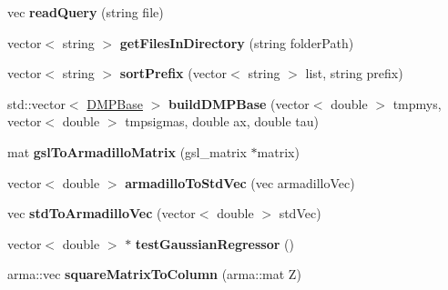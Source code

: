 \begin{DoxyCompactItemize}
\item 
\hypertarget{namespacekukadu_ac3b7339c98a02ebbacff3272fd3aa6e0}{vec {\bfseries read\-Query} (string file)}\label{namespacekukadu_ac3b7339c98a02ebbacff3272fd3aa6e0}

\item 
\hypertarget{namespacekukadu_a8967b22ed1eec57bc76b687a63ab4a03}{vector$<$ string $>$ {\bfseries get\-Files\-In\-Directory} (string folder\-Path)}\label{namespacekukadu_a8967b22ed1eec57bc76b687a63ab4a03}

\item 
\hypertarget{namespacekukadu_a6c32f5b1575bda3fba2fb6aa361e6f71}{vector$<$ string $>$ {\bfseries sort\-Prefix} (vector$<$ string $>$ list, string prefix)}\label{namespacekukadu_a6c32f5b1575bda3fba2fb6aa361e6f71}

\item 
\hypertarget{namespacekukadu_a383a9d72755140f9dcf797a99e9eb77d}{std\-::vector$<$ \hyperlink{classkukadu_1_1DMPBase}{D\-M\-P\-Base} $>$ {\bfseries build\-D\-M\-P\-Base} (vector$<$ double $>$ tmpmys, vector$<$ double $>$ tmpsigmas, double ax, double tau)}\label{namespacekukadu_a383a9d72755140f9dcf797a99e9eb77d}

\item 
\hypertarget{namespacekukadu_affb25d35d5eef5bc7d803a94c0e66739}{mat {\bfseries gsl\-To\-Armadillo\-Matrix} (gsl\-\_\-matrix $\ast$matrix)}\label{namespacekukadu_affb25d35d5eef5bc7d803a94c0e66739}

\item 
\hypertarget{namespacekukadu_aa526722c4b4af0fe1798ec3dc80c8ce5}{vector$<$ double $>$ {\bfseries armadillo\-To\-Std\-Vec} (vec armadillo\-Vec)}\label{namespacekukadu_aa526722c4b4af0fe1798ec3dc80c8ce5}

\item 
\hypertarget{namespacekukadu_aa810194d5e61a8bfbf3d3b1e4aa405ef}{vec {\bfseries std\-To\-Armadillo\-Vec} (vector$<$ double $>$ std\-Vec)}\label{namespacekukadu_aa810194d5e61a8bfbf3d3b1e4aa405ef}

\item 
\hypertarget{namespacekukadu_affc5bcde345f3ad613e5546d02a167c4}{vector$<$ double $>$ $\ast$ {\bfseries test\-Gaussian\-Regressor} ()}\label{namespacekukadu_affc5bcde345f3ad613e5546d02a167c4}

\item 
\hypertarget{namespacekukadu_a66cd2d039457ad6fe13c55450ec6357d}{arma\-::vec {\bfseries square\-Matrix\-To\-Column} (arma\-::mat Z)}\label{namespacekukadu_a66cd2d039457ad6fe13c55450ec6357d}


\end{DoxyCompactItemize}

